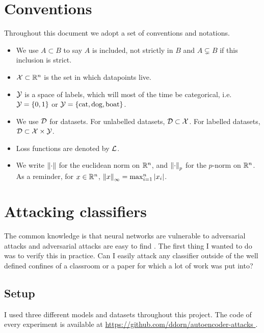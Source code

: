 \documentclass[]{scrarticle}
\begin{document}
  \clearpage
  \tableofcontents

\clearpage
\section*{Conventions}

Throughout this document we adopt a set of conventions and notations.
\begin{itemize}
  \item We use $A \subset B$ to say $A$ is included, not strictly in $B$
    and $A \subsetneq B$ if this inclusion is strict.
  \item $\mathcal X \subset \mathbb R^n$ is the set in which datapoints live.
  \item $\mathcal Y$ is a space of labels, which will most of the time be categorical,
    i.e. $\mathcal Y = \left\{ 0, 1 \right\}$ or $\mathcal Y = \left\{ \text{cat}, \text{dog}, \text{boat} \right\}$.
  \item We use $\mathcal D$ for datasets. For unlabelled datasets, $\mathcal D \subset \mathcal X$.
    For labelled datasets, $\mathcal D \subset \mathcal X \times \mathcal Y$.
  \item Loss functions are denoted by $\mathcal L$.
  \item We write $\left\| \cdot \right\|$ for the euclidean norm on $\mathbb R^n$,
    and $\left\| \cdot \right\|_p$ for the $p$-norm on $\mathbb R^n$.
    As a reminder, for $x \in \mathbb R^n$, $\left\| x \right\|_\infty = \max_{i=1}^n \left| x_i \right|$.
\end{itemize}


\clearpage

\section{Attacking classifiers}
The common knowledge is that neural networks are vulnerable to adversarial attacks
and adversarial attacks are easy to find \cite{szegedy2013intriguing,goodfellow2014explaining,liu2021survey}.
The first thing I wanted to do was to verify this in practice. Can I easily
attack any classifier outside of the well defined confines of a classroom
or a paper for which a lot of work was put into?

\subsection{Setup}
I used three different models and datasets throughout this project.
The code of every experiment is available at \url{
  https://github.com/ddorn/autoencoder-attacks
}.
\end{document}

